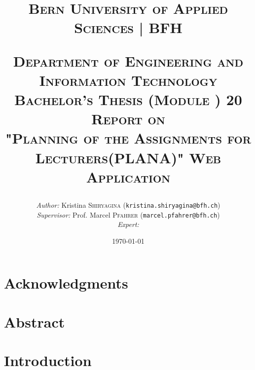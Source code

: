 \documentclass{scrartcl}
\begin{document}
\begin{titlepage}


\title{\textsc{\LARGE Bern University of Applied Sciences | BFH }\\[1cm]
\begin{center}
\end{center}
\textsc{\small Department of Engineering and Information Technology}\\
\textsc{\small Bachelor's Thesis (Module ) 20}\\[1cm]
\textsc{\small Report on  }\\
\textsc{"Planning of the Assignments for Lecturers(PLANA)" Web Application}}
\date{\today}   %
\author{\textit{Author: }Kristina \textsc{Shiryagina} (\texttt{kristina.shiryagina@bfh.ch}) \\
 \textit{Supervisor: } Prof. Marcel \textsc{Pfahrer}  (\texttt{marcel.pfahrer@bfh.ch})\\
 \textit{Expert: }  \textsc{} \\
 }
\maketitle	

\newpage


	
\tableofcontents
\clearpage
\end{titlepage}

\setcounter{secnumdepth}{-2}%



\section{Acknowledgments}


\section{Abstract}





\section{Introduction}
\end{document}
